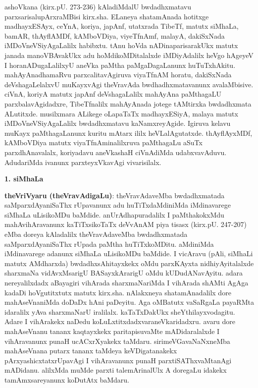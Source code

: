 ashoVkana (kirx.pU. 273-236) kAladiMdalU bwdadhxmatavu parxsarisalu\break pArxraMBisi kirx.sha. ELaneya shatamAnada hotitxge madhayxESAyx, ceYnA, koriya, japAnf, utatxrada TibeTf, matutx siMhaLa, bamAR, thAyflAMDf, kAMboVDiya, viyeTf\-nAmf, malayA, dakiSxNada iMDoVneVSiyAgaLalilx habibxtu. tAnu hoVda nADina\break pari\-sarakUkx matutx janada manoVBAvakUkx adu hoMdikoMDitalalxde iMDiyAdalilx heVgo hAgeyeV I horanADugaLalilxyU aneVka paMtha paMgaDagaLanunx huTuTx\-hAkitu. mahAyAnadhamaRvu parxcalitavAgiruva viyaTfnAM horatu, dakiSxNada deVshagaLelalxvU muKayxvAgi theVravAda bwdhadhxmatavanunx avalaMbisive. ciVnA, koriyA matutx japAnf deVshagaLalilx mahAyAna paMthagaLU parxbalavAgidadxre, TibeTfnalilx mahAyAnada jotege tAMtirxka bwdadhxmata ALutitxde. musilxmara ALikege oLapaTaTx madhayxESiyA, malaya matutx iMDoVneVSiyAgaLalilx bwdadhxmatavu kaNamxreyAgide. Igiruva kelavu muKayx paMthagaLanunx kuritu mAtarx ililx heVLalAgutatxde. thAyflAyxMDf, kAMboVDiya matutx viyaTfnAminalilxruva paMthagaLu aSuTx parxdhAnavalalx, koriyadavu aneVkashaH ciVnAdiMda udabxvavAduvu. AdudariMda ivanunx parxteyxVkavAgi vivarisilalx.

\medskip
\begin{center}
{\textbf{\Large 1. siMhaLa}}
\end{center}

{\bf theVriVyaru (theVravAdigaLu)}: theVravAdaveMba bwdadhxmatada saMparxdAyaniSaThx rUpavanunx adu huTiTxdaMdiniMda iMdinavarege siMhaLa uLisikoMDu baMdide. anUrAdhapuradalilx I paMthakokxMdu mahAvihAravanunx kaTiTxsikoTaTx deVvAnAM piya tisasx (kirx.pU. 247-207) eMba doreya kAladalilx theVravAdaveMba bwdadhxmatada saMparxdAyaniSaThx rUpada paMtha huTiTxkoMDitu. aMdiniMda iMdinavarege adanunx siMhaLa uLisikoMDu baMdide. I vicAravu (pAli, siMhaLi matutx AMdharxda) bwdadhxsAhitayxkekx oMdu parxKAyxta nidhiyAyitalalxde sharxmaNa vidAvxMsarigU BASayxkArarigU oMdu kUDudANavAyitu. adara nereyalilxdadx aBayagiri vihArada sharxmaNariMda I vihArada shAMti AgAga kadaDi hoVgutitxtutx matutx kirx.sha. nAlakxneya shatamAnadalilx dore mahAseVnaniMda doDaDx hAni paDeyitu. Aga oMBatutx vaSaRgaLa payaRMta idaralilx yAva sharxmaNarU iralilalx. kaTaTxDakUkx sheYthilayxvodagitu. Adare I vihArakekx naDedu koLuLxtitxdadxvaraneVkaridadxru. avaru dore mahAseVnanu tananx kaqtayxkekx paritapisuvaMte mADidaralalxde I vihAravanunx punaH ucACxrXyakekx taMdaru. sirimeVGavaNaNxneMba mahAseVnana putarx tananx taMdeya keVDigatanakekx pArxyashicxtatxrUpavAgi I vihAravanunx punaH parxtiSAThxvaMtanAgi mADidanu. alilxMda muMde parxti talemArinalUlx A doregaLu idakekx tamAmxsareyanunx koDutAtx baMdaru.

